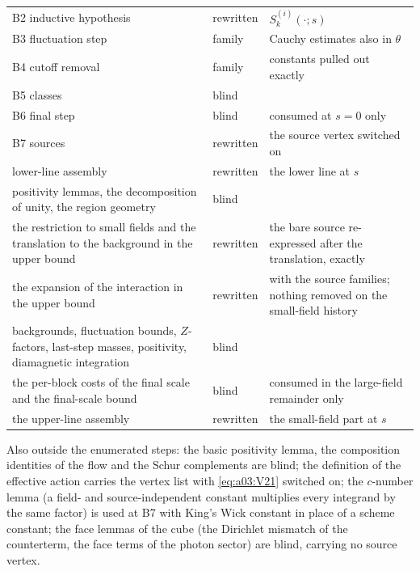 \begin{center}
\begin{tabular}{p{}lp{}}
B2 inductive hypothesis & rewritten & $S^{(i)}_k(\cdot;s)$ \\
B3 fluctuation step & family & Cauchy estimates also in $\theta$ \\
B4 cutoff removal & family & constants pulled out exactly \\
B5 classes & blind & \\
B6 final step & blind & consumed at $s=0$ only \\
B7 sources & rewritten & the source vertex switched on \\
lower-line assembly & rewritten & the lower line at $s$ \\
positivity lemmas, the decomposition of unity, the region geometry & blind & \\
the restriction to small fields and the translation to the background in the upper bound \cite[(2.11)--(2.14), (2.43)]{Ba2} & rewritten & the bare source re-expressed after the translation, exactly \\
the expansion of the interaction in the upper bound & rewritten & with the source families; nothing removed on the small-field history \\
backgrounds, fluctuation bounds, $Z$-factors, last-step masses, positivity, diamagnetic integration & blind & \\
the per-block costs of the final scale and the final-scale bound & blind & consumed in the large-field remainder only \\
the upper-line assembly & rewritten & the small-field part at $s$ \\
\hline
\end{tabular}
\end{center}

Also outside the enumerated steps: the basic positivity lemma, the composition identities of the flow and the Schur complements are blind; the definition of the effective action carries the vertex list with \eqref{eq:a03:V21} switched on; the $c$-number lemma (a field- and source-independent constant multiplies every integrand by the same factor) is used at B7 with King's Wick constant in place of a scheme constant; the face lemmas of the cube (the Dirichlet mismatch of the counterterm, the face terms of the photon sector) are blind, carrying no source vertex.
